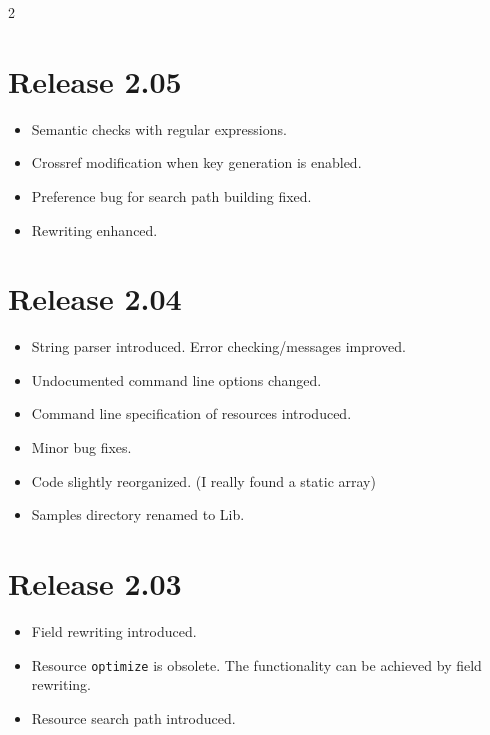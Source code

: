 \documentclass[11pt,a4paper]{scrartcl}
\newcommand\rsc[1]{\texttt{#1}}
\newcommand\File[1]{\textsf{#1}}
\newenvironment{Releases}{\begin{multicols}2\RaggedRight}{\end{multicols}}
\newenvironment{Release}[2]{%
  \def\tmp{#2}%
  \section*{Release #1 \ifx\tmp\empty\else{\normalsize[#2]}\fi}
  \begin{itemize}
}{\end{itemize}}
\newenvironment{Fix}[1]{\item }{}
\newenvironment{New}[1]{\item }{}
\newenvironment{Update}[1]{\item }{}
\begin{document}
\begin{Releases}
 \begin{Release}{2.05}{}
  \begin{New}{gene}
    Semantic checks with regular expressions.
  \end{New}
  \begin{Update}{gene}
    Crossref modification when key generation is enabled.
  \end{Update}
  \begin{Fix}{gene}
    Preference bug for search path building fixed.
  \end{Fix}
  \begin{Update}{gene}
    Rewriting enhanced.
  \end{Update}
 \end{Release}

 \begin{Release}{2.04}{}
  \begin{New}{gene}
    String parser introduced. Error checking/messages improved.
  \end{New}
  \begin{Update}{gene}
    Undocumented command line options changed.
  \end{Update}
  \begin{New}{gene}
    Command line specification of resources introduced.
  \end{New}
  \begin{Fix}{gene}
    Minor bug fixes.
  \end{Fix}
  \begin{Update}{gene}
    Code slightly reorganized. (I really found a static array)
  \end{Update}
  \begin{Update}{gene}
    Samples directory renamed to \File{Lib}.
  \end{Update}
 \end{Release}

 \begin{Release}{2.03}{}
  \begin{New}{gene}
    Field rewriting introduced.
  \end{New}
  \begin{Update}{gene}
    Resource \rsc{optimize} is obsolete. The functionality can
    be achieved by field rewriting.
  \end{Update}
  \begin{New}{gene}
    Resource search path introduced.
  \end{New}
 \end{Release}


\end{Releases}
\end{document}
